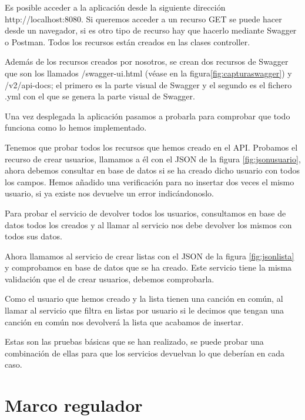 \documentclass[12pt]{report} %
\begin{document}
Es posible acceder a la aplicación desde la siguiente dirección http://localhost:8080. Si queremos acceder a un recurso GET se puede hacer desde un navegador, si es otro tipo de recurso hay que hacerlo mediante Swagger o Postman. Todos los recursos están creados en las clases controller.

Además de los recursos creados por nosotros, se crean dos recursos de Swagger que son los llamados /swagger-ui.html (véase en la figura\ref{fig:capturaswagger}) y /v2/api-docs; el primero es la parte visual de Swagger y el segundo es el fichero .yml con el que se genera la parte visual de Swagger.

Una vez desplegada la aplicación pasamos a probarla para comprobar que todo funciona como lo hemos implementado.

Tenemos que probar todos los recursos que hemos creado en el API. Probamos el recurso de crear usuarios, llamamos a él con el JSON de la figura \ref{fig:jsonusuario}, ahora debemos consultar en base de datos si se ha creado dicho usuario con todos los campos. Hemos añadido una verificación para no insertar dos veces el mismo usuario, si ya existe nos devuelve un error indicándonoslo.

Para probar el servicio de devolver todos los usuarios, consultamos en base de datos todos los creados y al llamar al servicio nos debe devolver los mismos con todos sus datos.

Ahora llamamos al servicio de crear listas con el JSON de la figura \ref{fig:jsonlista} y comprobamos en base de datos que se ha creado. Este servicio tiene la misma validación que el de crear usuarios, debemos comprobarla.

Como el usuario que hemos creado y la lista tienen una canción en común, al llamar al servicio que filtra en listas por usuario si le decimos que tengan una canción en común nos devolverá la lista que acabamos de insertar.

Estas son las pruebas básicas que se han realizado, se puede probar una combinación de ellas para que los servicios devuelvan lo que deberían en cada caso.


\chapter{Marco regulador}
\end{document}
